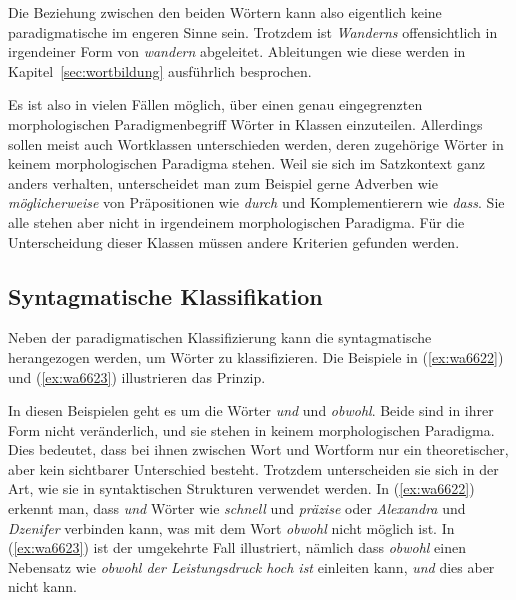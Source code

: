 
Die Beziehung zwischen den beiden Wörtern kann also eigentlich keine paradigmatische im engeren Sinne sein.
Trotzdem ist \textit{Wanderns} offensichtlich in irgendeiner Form von \textit{wandern} abgeleitet.
Ableitungen wie diese werden in Kapitel~\ref{sec:wortbildung} ausführlich besprochen.

Es ist also in vielen Fällen möglich, über einen genau eingegrenzten morphologischen Paradigmenbegriff Wörter in Klassen einzuteilen.
Allerdings sollen meist auch Wortklassen unterschieden werden, deren zugehörige Wörter in keinem morphologischen Paradigma stehen.
Weil sie sich im Satzkontext ganz anders verhalten, unterscheidet man zum Beispiel gerne Adverben wie \textit{möglicherweise} von Präpositionen wie \textit{durch} und Komplementierern wie \textit{dass}.
Sie alle stehen aber nicht in irgendeinem morphologischen Paradigma.
Für die Unterscheidung dieser Klassen müssen andere Kriterien gefunden werden.

\subsection{Syntagmatische Klassifikation}

\label{sec:syntagmatischeklassifikation}

Neben der paradigmatischen Klassifizierung kann die syntagmatische herangezogen werden, um Wörter zu klassifizieren.
Die Beispiele in (\ref{ex:wa6622}) und (\ref{ex:wa6623}) illustrieren das Prinzip.

\begin{exe}
  \ex\label{ex:wa6622}
  \begin{xlist}
  \end{xlist}
  \ex\label{ex:wa6623}
  \begin{xlist}
  \end{xlist}
\end{exe}

In diesen Beispielen geht es um die Wörter \textit{und} und \textit{obwohl}.
Beide sind in ihrer Form nicht veränderlich, und sie stehen in keinem morphologischen Paradigma.
Dies bedeutet, dass bei ihnen zwischen Wort und Wortform nur ein theoretischer, aber kein sichtbarer Unterschied besteht.
Trotzdem unterscheiden sie sich in der Art, wie sie in syntaktischen Strukturen verwendet werden.
In (\ref{ex:wa6622}) erkennt man, dass \textit{und} Wörter wie \textit{schnell} und \textit{präzise} oder \textit{Alexandra} und \textit{Dzenifer} verbinden kann, was mit dem Wort \textit{obwohl} nicht möglich ist.
In (\ref{ex:wa6623}) ist der umgekehrte Fall illustriert, nämlich dass \textit{obwohl} einen Nebensatz wie \textit{obwohl der Leistungsdruck hoch ist} einleiten kann, \textit{und} dies aber nicht kann.

